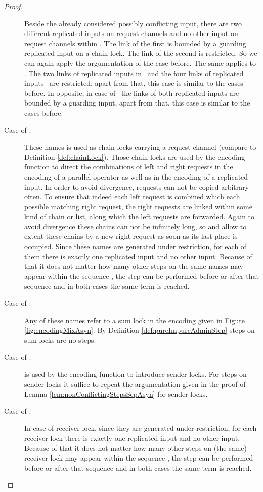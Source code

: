 \documentclass[]{llncs}
\begin{document}
\begin{proof}
\begin{description}
			Beside the already considered possibly conflicting input, there are two different replicated inputs on request channels and no other input on request channels within \processRightOutputRequests. The link of the first is bounded by a guarding replicated input on a chain lock. The link of the second is restricted. So we can again apply the argumentation of the case before. The same applies to \processRightInputRequests. The two links of replicated inputs in \pushRequests \ and the four links of replicated inputs \pushRequestsOut \ are restricted, apart from that, this case is similar to the cases before. In opposite, in case of \pushRequestsIn \ the links of both replicated inputs are bounded by a guarding input, apart from that, this case is similar to the cases before.
		\item[Case of :] These names is used as chain locks carrying a request channel (compare to Definition \ref{def:chainLock}). Those chain locks are used by the encoding function to direct the combinations of left and right requests in the encoding of a parallel operator as well as in the encoding of a replicated input. In order to avoid divergence, requests can not be copied arbitrary often. To ensure that indeed each left request is combined which each possible matching right request, the right requests are linked within some kind of chain or list, along which the left requests are forwarded. Again to avoid divergence these chains can not be infinitely long, so  and  allow to extent these chains by a new right request as soon as its last place is occupied. Since these names are generated under restriction, for each of them there is exactly one replicated input and no other input. Because of that it does not matter how many other steps on the same names may appear within the sequence , the step  can be performed before or after that sequence and in both cases the same term  is reached.
		\item[Case of :] Any of these names refer to a sum lock in the encoding given in Figure \ref{fig:encodingMixAsyn}. By Definition \ref{def:pureImpureAdminStep} steps on sum locks are no \pure \admin steps.
		\item[Case of :]  is used by the encoding function to introduce sender locks. For steps on sender locks it suffice to repeat the argumentation given in the proof of Lemma \ref{lem:nonConflictingStepsSepAsyn} for sender locks.
		\item[Case of :] In case of receiver lock, since they are generated under restriction, for each receiver lock there is exactly one replicated input and no other input. Because of that it does not matter how many other steps on (the same) receiver lock may appear within the sequence , the step  can be performed before or after that sequence and in both cases the same term  is reached.

\end{description}
\end{proof}
\end{document}
